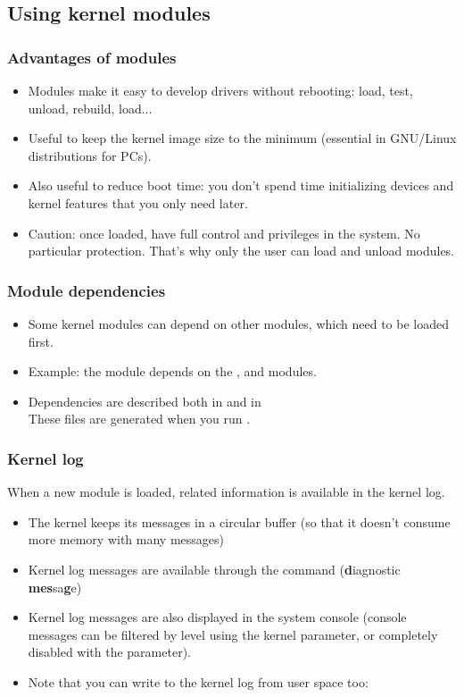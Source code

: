\subsection{Using kernel modules}

\begin{frame}
  \frametitle{Advantages of modules}
  \begin{itemize}
  \item Modules make it easy to develop drivers without rebooting:
    load, test, unload, rebuild, load...
  \item Useful to keep the kernel image size to the minimum (essential
    in GNU/Linux distributions for PCs).
  \item Also useful to reduce boot time: you don't spend time
    initializing devices and kernel features that you only need later.
  \item Caution: once loaded, have full control and privileges in the
    system. No particular protection. That's why only the  user
    can load and unload modules.
  \end{itemize}
\end{frame}

\begin{frame}
  \frametitle{Module dependencies}
  \begin{itemize}
  \item Some kernel modules can depend on other modules,
    which need to be loaded first.
  \item Example: the  module depends on the
    ,  and  modules.
  \item Dependencies are described
    both in 
    and in \\
    These files are generated when you run .
  \end{itemize}
\end{frame}

\begin{frame}
  \frametitle{Kernel log}

  When a new module is loaded, related information is available in the
  kernel log.
  \begin{itemize}
  \item The kernel keeps its messages in a circular buffer (so that it
    doesn't consume more memory with many messages)
  \item Kernel log messages are available through the 
    command ({\bf d}iagnostic {\bf mes}sa{\bf g}e)
  \item Kernel log messages are also displayed in the system console
    (console messages can be filtered by level using the
     kernel parameter, or completely disabled with the
     parameter).
  \item Note that you can write to the kernel log from user space too:\\
  \end{itemize}
\end{frame}

